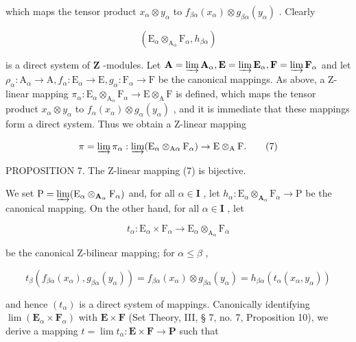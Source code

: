which maps the tensor product \(x_{\alpha} \otimes y_{\alpha}\) to \(f_{\beta\alpha}(x_{\alpha}) \otimes g_{\beta\alpha}(y_{\alpha})\) . Clearly

\[
\left(\mathrm{E} _ {\alpha} \otimes_ {\mathrm{A} _ {\alpha}} \mathrm{F} _ {\alpha}, h _ {\beta \alpha}\right)
\]

is a direct system of \(\mathbf{Z}\) -modules. Let \(\mathbf{A} = \varinjlim \mathbf{A}_{\alpha}, \mathbf{E} = \varinjlim \mathbf{E}_{\alpha}, \mathbf{F} = \varinjlim \mathbf{F}_{\alpha}\) and let \(\rho_{\alpha}: \mathrm{A}_{\alpha} \to \mathrm{A}, f_{\alpha}: \mathrm{E}_{\alpha} \to \mathrm{E}, g_{\alpha}: \mathrm{F}_{\alpha} \to \mathrm{F}\) be the canonical mappings. As above, a Z-linear mapping \(\pi_{\alpha}: \mathrm{E}_{\alpha} \otimes_{\mathrm{A}_{\alpha}} \mathrm{F}_{\alpha} \to \mathrm{E} \otimes_{\mathrm{A}} \mathrm{F}\) is defined, which maps the tensor product \(x_{\alpha} \otimes y_{\alpha}\) to \(f_{\alpha}(x_{\alpha}) \otimes g_{\alpha}(y_{\alpha})\) , and it is immediate that these mappings form a direct system. Thus we obtain a Z-linear mapping

\[
\pi = \varinjlim \pi_ {\alpha}: \varinjlim (\mathrm{E} _ {\alpha} \otimes_ {\mathrm{A} \alpha} \mathrm{F} _ {\alpha}) \rightarrow \mathrm{E} \otimes_ {\mathrm{A}} \mathrm{F}.\tag{7}
\]

PROPOSITION 7. The Z-linear mapping (7) is bijective.

We set \(\mathrm{P} = \varinjlim (\mathrm{E}_{\alpha}\otimes_{\mathbf{A}_{\alpha}}\mathrm{F}_{\alpha})\) and, for all \(\alpha \in \mathbf{I}\) , let \(h_\alpha : \mathrm{E}_\alpha \otimes_{\mathbf{A}_\alpha}\mathrm{F}_\alpha \to \mathrm{P}\) be the canonical mapping. On the other hand, for all \(\alpha \in \mathbf{I}\) , let

\[
t _ {\alpha}: \mathrm{E} _ {\alpha} \times \mathrm{F} _ {\alpha} \rightarrow \mathrm{E} _ {\alpha} \otimes_ {\mathrm{A} _ {\alpha}} \mathrm{F} _ {\alpha}
\]

be the canonical Z-bilinear mapping; for \(\alpha \leqslant \beta\) ,

\[
t _ {\beta} \left(f _ {\beta \alpha} \left(x _ {\alpha}\right), g _ {\beta \alpha} \left(y _ {\alpha}\right)\right) = f _ {\beta \alpha} \left(x _ {\alpha}\right) \otimes g _ {\beta \alpha} \left(y _ {\alpha}\right) = h _ {\beta \alpha} \left(t _ {\alpha} \left(x _ {\alpha}, y _ {\alpha}\right)\right)
\]

and hence \((t_{\alpha})\) is a direct system of mappings. Canonically identifying \(\lim (\mathbf{E}_{\alpha}\times \mathbf{F}_{\alpha})\) with \(\mathbf{E}\times \mathbf{F}\) (Set Theory, III, § 7, no. 7, Proposition 10), we derive a mapping \(t = \lim t_{\alpha}:\mathbf{E}\times \mathbf{F}\to \mathbf{P}\) such that

